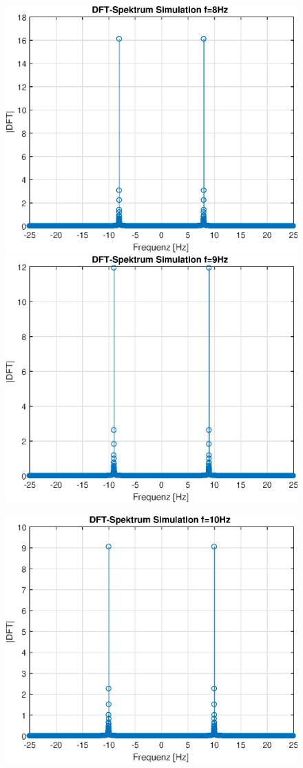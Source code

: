 \documentclass{article}
\begin{document}
\begin{figure}[!h]
\includegraphics[width=0.5\linewidth]{img/sim_fft_sine_freq_8}
\includegraphics[width=0.5\linewidth]{img/sim_fft_sine_freq_9}
\end{figure}
\begin{figure}[!h]
\centering
\includegraphics[width=0.5\linewidth]{img/sim_fft_sine_freq_10}
\end{figure}


\newpage
\end{document}
